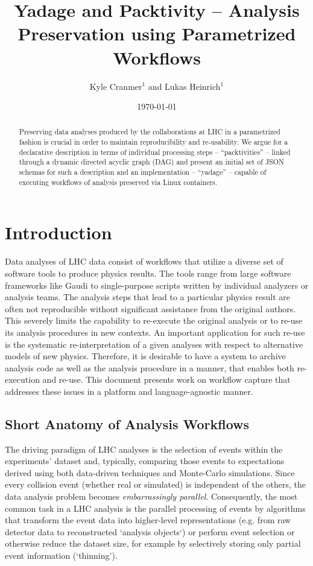 \documentclass[a4paper]{jpconf}
\date{\today}
\begin{document}
\title{Yadage and Packtivity -- Analysis Preservation using Parametrized Workflows}

\author{Kyle Cranmer$^1$ and Lukas Heinrich$^1$}
\address{$^1$ Department of Physics, New York University, New York, USA}


\begin{abstract}
	Preserving data analyses produced by the collaborations at LHC in a parametrized fashion is crucial in order to maintain reproducibility and re-usability. We argue for a declarative description in terms of individual processing steps -- ``packtivities'' -- linked through a dynamic directed acyclic graph (DAG) and present an initial set of JSON schemas for such a description and an implementation -- ``yadage'' --  capable of executing workflows of analysis preserved via Linux containers.
\end{abstract}

\section{Introduction}

Data analyses of LHC data consist of workflows that utilize a diverse set of software tools to produce physics results. The tools range from large software frameworks like Gaudi\cite{Gaudi2001} to single-purpose scripts written by individual analyzers or analysis teams. The analysis steps that lead to a particular physics result are often not reproducible without significant assistance from the original authors. This severely limits the capability to re-execute the original analysis or to re-use its analysis procedures in new contexts. An important application for such re-use is the systematic re-interpretation of a given analyses with respect to alternative models of new physics\cite{Cranmer2011}. Therefore, it is desirable to have a system to archive analysis code as well as the analysis procedure in a manner, that enables both re-execution and re-use. This document presents work on workflow capture that addresses these issues in a platform and language-agnostic manner.

\subsection{Short Anatomy of Analysis Workflows}

The driving paradigm of LHC analyses is the selection of events within the experiments' dataset and, typically, comparing those events to expectations derived using both data-driven techniques and Monte-Carlo simulations. Since every collision event (whether real or simulated) is independent of the others, the data analysis problem becomes \emph{embarrassingly parallel}. Consequently, the most common task in a LHC analysis is the parallel processing of events by algorithms that transform the event data into higher-level representations (e.g. from raw detector data to reconstructed `analysis objects`) or perform event selection or otherwise reduce the dataset size, for example by selectively storing only partial event information (`thinning').
\end{document}
